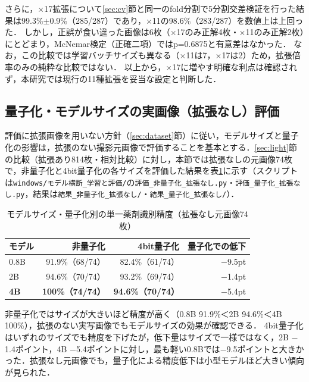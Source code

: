 \documentclass[dvipdfmx]{jsarticle}
\begin{document}
さらに，$\times$17拡張について\ref{sec:cv}節と同一のfold分割で5分割交差検証を行った結果は99.3\%$\pm$0.9\%（285/287）であり，$\times$11の98.6\%（283/287）を数値上は上回った．
しかし，正誤が食い違った画像は6枚（$\times$17のみ正解4枚・$\times$11のみ正解2枚）にとどまり，McNemar検定（正確二項）ではp=0.6875と有意差はなかった．
なお，この比較では学習バッチサイズも異なる（$\times$11は7，$\times$17は2）ため，拡張倍率のみの純粋な比較ではない．
以上から，$\times$17に増やす明確な利点は確認されず，本研究では現行の11種拡張を妥当な設定と判断した．

\subsection{量子化・モデルサイズの実画像（拡張なし）評価}\label{sec:quant_real}

評価に拡張画像を用いない方針（\ref{sec:dataset}節）に従い，モデルサイズと量子化の影響は，拡張のない撮影元画像で評価することを基本とする．\ref{sec:light}節の比較（拡張あり814枚・相対比較）に対し，本節では拡張なしの元画像74枚で，非量子化と4bit量子化の各サイズを評価した結果を表\ref{tab:quant_real}に示す（スクリプトは\texttt{windows/モデル横断\_学習と評価/}の\texttt{評価\_非量子化\_拡張なし.py}・\texttt{評価\_量子化\_拡張なし.py}，結果は\texttt{結果\_非量子化\_拡張なし/}・\texttt{結果\_量子化\_拡張なし/}）．

\begin{table}[htbp]
\centering
\caption{モデルサイズ・量子化別の単一薬剤識別精度（拡張なし元画像74枚）}
\label{tab:quant_real}
\begin{tabular}{lrrr}
\hline
モデル & 非量子化 & 4bit量子化 & 量子化での低下 \\
\hline
0.8B & 91.9\%（68/74） & 82.4\%（61/74） & $-$9.5pt \\
2B & 94.6\%（70/74） & 93.2\%（69/74） & $-$1.4pt \\
\textbf{4B} & \textbf{100\%（74/74）} & \textbf{94.6\%（70/74）} & $-$5.4pt \\
\hline
\end{tabular}
\end{table}

非量子化ではサイズが大きいほど精度が高く（0.8B 91.9\%＜2B 94.6\%＜4B 100\%），拡張のない実写画像でもモデルサイズの効果が確認できる．
4bit量子化はいずれのサイズでも精度を下げたが，低下量はサイズで一様ではなく，2B $-$1.4ポイント，4B $-$5.4ポイントに対し，最も軽い0.8Bでは$-$9.5ポイントと大きかった．拡張なし元画像でも，量子化による精度低下は小型モデルほど大きい傾向が見られた．
\end{document}
